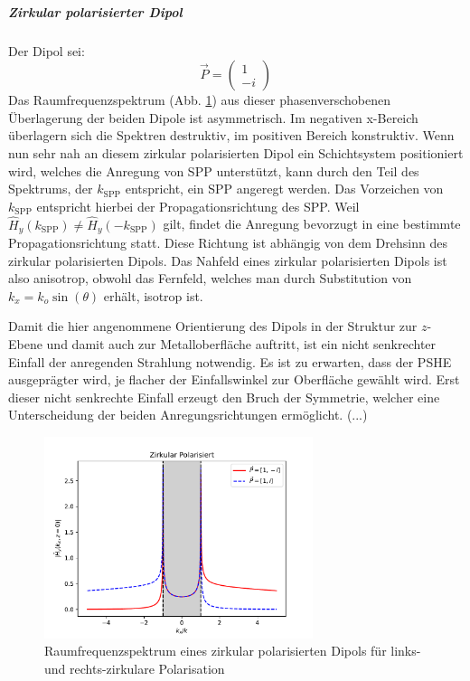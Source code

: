 \documentclass[titlepage,  ngerman]{article}
\begin{document}
	\subparagraph{Zirkular polarisierter Dipol}
	Der Dipol sei:
	$$\vec{P} = \begin{pmatrix} 1 \\ -i\end{pmatrix}$$
	Das Raumfrequenzspektrum (Abb. \ref{fig:spatial_spectrum_circ}) aus dieser phasenverschobenen Überlagerung der beiden Dipole ist asymmetrisch.  Im negativen x-Bereich überlagern sich die Spektren destruktiv, im positiven Bereich konstruktiv. Wenn nun sehr nah an diesem zirkular polarisierten Dipol ein Schichtsystem positioniert wird, welches die Anregung von SPP unterstützt, kann durch den Teil des Spektrums, der $k_{\mathrm{SPP}}$ entspricht, ein SPP angeregt werden. Das Vorzeichen von $k_{\mathrm{SPP}}$ entspricht hierbei der Propagationsrichtung des SPP. Weil $\hat{H}_y(k_{\mathrm{SPP}}) \neq \hat{H}_y( -k_{\mathrm{SPP}}) $ gilt, findet die Anregung bevorzugt in eine bestimmte Propagationsrichtung statt. Diese Richtung ist abhängig von dem Drehsinn des zirkular polarisierten Dipols.			
	Das Nahfeld eines zirkular polarisierten Dipols ist also anisotrop, obwohl das Fernfeld, welches man durch Substitution von $k_x = k_o \sin(\theta)$ erhält, isotrop ist.
	
	Damit die hier angenommene Orientierung des Dipols in der Struktur zur $z$-Ebene und damit auch zur Metalloberfläche auftritt, ist ein nicht senkrechter Einfall der anregenden Strahlung notwendig. Es ist zu erwarten, dass der PSHE ausgeprägter wird, je flacher der Einfallswinkel zur Oberfläche gewählt wird. Erst dieser nicht senkrechte Einfall erzeugt den Bruch der Symmetrie, welcher eine Unterscheidung der beiden Anregungsrichtungen ermöglicht. (...)
	\begin{figure}[h]
		\centering
		\includegraphics[width=0.7\textwidth]{figures/spatial_spectrum_circ.pdf}
		\caption[Raumfrequenzspektrum zirkular polarisierter Dipol]{Raumfrequenzspektrum eines zirkular polarisierten Dipols für links- und rechts-zirkulare Polarisation}
		\label{fig:spatial_spectrum_circ}
	\end{figure}	
	
\end{document}
